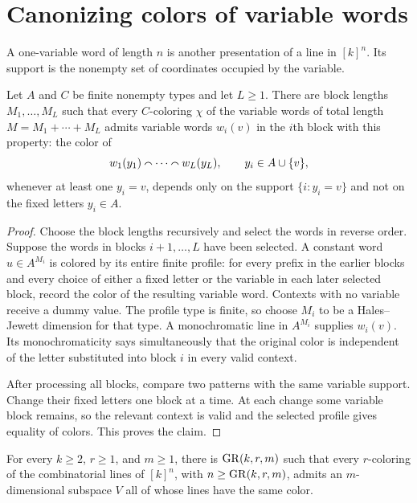 \section{Canonizing colors of variable words}

A one-variable word of length $n$ is another presentation of a line in $[k]^n$.  Its support is
the nonempty set of coordinates occupied by the variable.

\begin{lemma}
\label{lem:block-canonization}
Let $A$ and $C$ be finite nonempty types and let $L\geq1$.  There are block lengths
$M_1,\ldots,M_L$ such that every $C$-coloring $\chi$ of the variable words of total length
$M=M_1+\cdots+M_L$ admits variable words $w_i(v)$ in the $i$th block with this property:
the color of
\[
  w_1(y_1)\mathbin{\smallfrown}\cdots\mathbin{\smallfrown} w_L(y_L),
  \qquad y_i\in A\cup\{v\},
\]
whenever at least one $y_i=v$, depends only on the support
$\{i:y_i=v\}$ and not on the fixed letters $y_i\in A$.
\end{lemma}

\begin{proof}
Choose the block lengths recursively and select the words in reverse order.  Suppose the words in
blocks $i+1,\ldots,L$ have been selected.  A constant word $u\in A^{M_i}$ is colored by its entire
finite profile: for every prefix in the earlier blocks and every choice of either a fixed letter or
the variable in each later selected block, record the color of the resulting variable word.
Contexts with no variable receive a dummy value.  The profile type is finite, so choose $M_i$ to
be a Hales--Jewett dimension for that type.  A monochromatic line in $A^{M_i}$ supplies $w_i(v)$.
Its monochromaticity says simultaneously that the original color is independent of the letter
substituted into block $i$ in every valid context.

After processing all blocks, compare two patterns with the same variable support.  Change their
fixed letters one block at a time.  At each change some variable block remains, so the relevant
context is valid and the selected profile gives equality of colors.  This proves the claim.
\end{proof}

\begin{theorem}
\label{thm:graham-rothschild}
For every $k\geq2$, $r\geq1$, and $m\geq1$, there is
$\operatorname{GR}(k,r,m)$ such that every $r$-coloring of the combinatorial lines of $[k]^n$, with
$n\geq\operatorname{GR}(k,r,m)$, admits an $m$-dimensional subspace $V$ all of whose lines have the same color.
\end{theorem}


